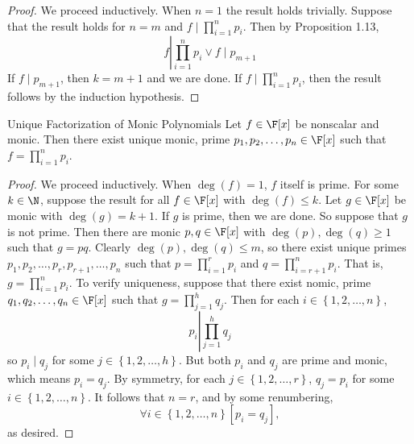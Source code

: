 \documentclass[linearalgebraII]{subfiles}
\begin{document}
    \begin{proof}
        We proceed inductively. When $n=1$ the result holds trivially. Suppose that the result holds for $n=m$ and $f\mid \prod^n_{i=1} p_i$. Then by Proposition 1.13,
        \begin{equation*}
            f\left|\prod^n_{i=1} p_i \lor f\mid p_{m+1}\right.
        \end{equation*}
        If $f\mid p_{m+1}$, then $k=m+1$ and we are done. If $f\mid\prod^n_{i=1} p_i$, then the result follows by the induction hypothesis.
    \end{proof}

    \clearpage
    \begin{theorem}{Unique Factorization of Monic Polynomials}
        Let $f\in \F[x]$ be nonscalar and monic. Then there exist unique monic, prime $p_1, p_2, \ldots, p_n\in \F[x]$ such that $f = \prod^n_{i=1} p_i$.
    \end{theorem}

    \begin{proof}
        We proceed inductively. When $\deg(f)=1$, $f$ itself is prime. For some $k\in \N$, suppose the result for all $f\in \F[x]$ with $\deg(f)\leq k$. Let $g\in \F[x]$ be monic with $\deg(g) = k+1$. If $g$ is prime, then we are done. So suppose that $g$ is not prime. Then there are monic $p, q\in \F[x]$ with $\deg(p),\deg(q)\geq 1$ such that $g=pq$. Clearly $\deg(p), \deg(q)\leq m$, so there exist unique primes $p_1, p_2, \ldots, p_r, p_{r+1}, \ldots, p_n$ such that $p =
        \prod^{r}_{i=1} p_i$ and $q = \prod^{n}_{i=r+1} p_i$. That is, $g = \prod^{n}_{i=1} p_i$. To verify uniqueness, suppose that there exist nomic, prime $q_1, q_2, \ldots, q_n\in \F[x]$ such that $g = \prod^{h}_{j=1} q_j$. Then for each $i\in \left\lbrace 1, 2, \ldots, n \right\rbrace$,
        \begin{equation*}
            p_i \left| \prod^{h}_{j=1} q_j\right. 
        \end{equation*}
        so $p_i\mid q_j$ for some $j\in \left\lbrace 1, 2, \ldots, h \right\rbrace$. But both $p_i$ and $q_j$ are prime and monic, which means $p_i = q_j$. By symmetry, for each $j\in \left\lbrace 1, 2, \ldots, r \right\rbrace$, $q_j = p_i$ for some $i\in \left\lbrace 1, 2, \ldots, n \right\rbrace$. It follows that $n = r$, and by some renumbering,
        \begin{equation*}
            \forall i\in \left\lbrace 1, 2, \ldots, n \right\rbrace \left[ p_i = q_j \right],
        \end{equation*}
        as desired.
    \end{proof}
\end{document}
